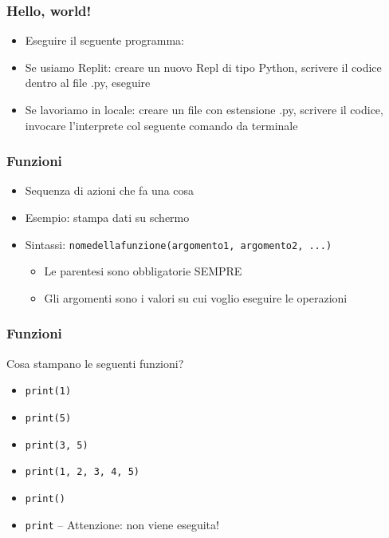 \begin{exerciseframe}
    \frametitle{Hello, world!}

    \begin{itemize}
        \item Eseguire il seguente programma: 

        \bigskip
        \item Se usiamo Replit: creare un nuovo Repl di tipo Python, scrivere il codice dentro al file .py, eseguire

        \bigskip
        \item Se lavoriamo in locale: creare un file con estensione .py, scrivere il codice, invocare l'interprete col seguente comando da terminale 
    \end{itemize}
\end{exerciseframe}


\begin{contentframe}
    \frametitle{Funzioni}

    \begin{itemize}
        \item Sequenza di azioni che fa una cosa

        \bigskip
        \item Esempio:  stampa dati su schermo

        \bigskip
        \item Sintassi: \texttt{nomedellafunzione(argomento1, argomento2, ...)}
        \begin{itemize}
            \item Le parentesi sono obbligatorie SEMPRE
            \item Gli argomenti sono i valori su cui voglio eseguire le operazioni
        \end{itemize}
    \end{itemize}
\end{contentframe}

\begin{exerciseframe}
    \frametitle{Funzioni}

    Cosa stampano le seguenti funzioni?
    \begin{itemize}
        \item \texttt{print(1)}\pause
        \item \texttt{print(5)}\pause
        \item \texttt{print(3, 5)}\pause
        \item \texttt{print(1, 2, 3, 4, 5)}\pause
        \item \texttt{print()}\pause
        \item \texttt{print}\pause{} -- Attenzione: non viene eseguita!
    \end{itemize}
\end{exerciseframe}

